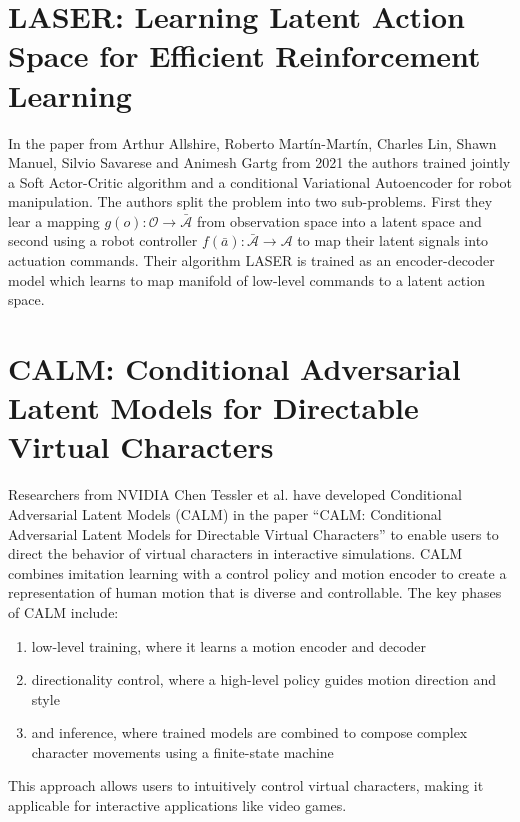 \section{LASER: Learning Latent Action Space for Efficient Reinforcement Learning}

In the paper from Arthur Allshire, Roberto Martín-Martín, Charles Lin, Shawn Manuel, Silvio Savarese and Animesh Gartg from 2021 \cite{LASER} the authors trained jointly a Soft Actor-Critic algorithm and a conditional Variational Autoencoder for robot manipulation. The authors split the problem into two sub-problems. First they lear a mapping $g(o): \mathcal{O} \to \bar{\mathcal{A}}$ from observation space into a latent space and second using a robot controller $f(\bar{a}): \bar{\mathcal{A}} \to \mathcal{A}$ to map their latent signals into actuation commands. Their algorithm LASER is trained as an encoder-decoder model which learns to map manifold of low-level commands to a latent action space. 

% 


\section{CALM: Conditional Adversarial Latent Models for Directable Virtual Characters}

Researchers from NVIDIA  Chen Tessler et al. have developed Conditional Adversarial Latent Models (CALM)  in the paper ``CALM: Conditional Adversarial Latent Models for Directable Virtual Characters''\cite{CALM} to enable users to direct the behavior of virtual characters in interactive simulations. CALM combines imitation learning with a control policy and motion encoder to create a representation of human motion that is diverse and controllable. The key phases of CALM include:
\begin{enumerate}
    \item low-level training, where it learns a motion encoder and decoder
    \item directionality control, where a high-level policy guides motion direction and style
    \item and inference, where trained models are combined to compose complex character movements using a finite-state machine
\end{enumerate}
This approach allows users to intuitively control virtual characters, making it applicable for interactive applications like video games.